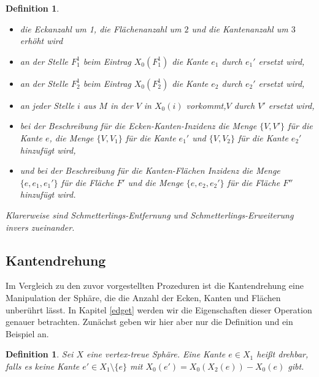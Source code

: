 \documentclass[12pt,titlepage,twoside,cleardoublepage]{article}
\theoremstyle{nummermitklammern}
\newtheorem{definition}[temp]{Definition}
\newtheorem{definition}[zahl]{Definition}
\numberwithin{equation}{section}
\begin{document}
\begin{definition}
 \begin{itemize}
 \item die Eckanzahl um 1, die Flächenanzahl um $2$ und die Kantenanzahl um $3$ erhöht wird 
 \item an der Stelle $F_1^1$ beim Eintrag $X_0(F_1^1)$ die Kante $e_1$ durch $e_1'$ ersetzt wird,
 \item an der Stelle $F_2^1$ beim Eintrag $X_0(F_2^1)$ die Kante $e_2$ durch $e_2'$ ersetzt wird,
 \item an jeder Stelle $i$ aus $M$ in der $V$ in $X_0(i)$ vorkommt,$V$ durch $V'$ ersetzt wird,  
\item  bei der Beschreibung  für die Ecken-Kanten-Inzidenz die Menge $\{V,V'\}$ für die Kante $e$, die Menge $\{V,V_1\}$ für die Kante $e_1'$ und $\{V,V_2\}$ für die Kante $e_2'$ hinzufügt wird,
\item und bei der Beschreibung für die Kanten-Flächen Inzidenz  die Menge $\{e,e_1,e_1'\}$ für die Fläche $F'$ und die Menge $\{e,e_2,e_2'\}$ für die Fläche $F''$ hinzufügt wird.
 \end{itemize}
  Klarerweise sind Schmetterlings-Entfernung und Schmetterlings-Erweiterung invers zueinander.
 \end{definition}
\subsection{Kantendrehung}
Im Vergleich zu den zuvor vorgestellten Prozeduren ist die Kantendrehung eine Manipulation der Sphäre, die die Anzahl der Ecken, Kanten und Flächen unberührt lässt. In Kapitel \ref{edget} werden wir die Eigenschaften dieser Operation genauer betrachten. Zunächst geben wir hier aber nur die Definition und ein Beispiel an.
\begin{definition}
Sei $X$ eine vertex-treue Sphäre. Eine Kante $e\in X_1$ heißt  \emph{drehbar}, falls es keine Kante $e'\in X_1\setminus \{e\}$ mit $X_0(e')=X_0(X_2(e))-X_0(e)$ gibt.
\end{definition}
\end{document}
